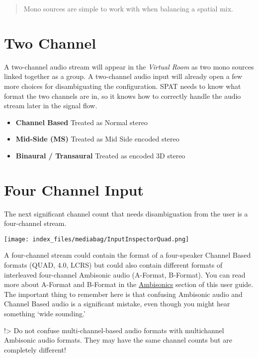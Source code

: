 \documentclass[
  letterpaper,
  DIV=11,
  numbers=noendperiod]{scrreport}
\providecommand{\tightlist}{%
  \setlength{\itemsep}{0pt}\setlength{\parskip}{0pt}}\usepackage{longtable,booktabs,array}
\begin{document}
\begin{quote}
Mono sources are simple to work with when balancing a spatial mix.
\end{quote}

\hypertarget{two-channel}{%
\section{Two Channel}\label{two-channel}}

A two-channel audio stream will appear in the \emph{Virtual Room} as two
mono sources linked together as a group. A two-channel audio input will
already open a few more choices for disambiguating the configuration.
SPAT needs to know what format the two channels are in, so it knows how
to correctly handle the audio stream later in the signal flow.

\begin{itemize}
\tightlist
\item
  \textbf{Channel Based} Treated as Normal stereo
\item
  \textbf{Mid-Side (MS)} Treated as Mid Side encoded stereo
\item
  \textbf{Binaural / Transaural} Treated as encoded 3D stereo
\end{itemize}

\hypertarget{four-channel-input}{%
\section{Four Channel Input}\label{four-channel-input}}

The next significant channel count that needs disambiguation from the
user is a four-channel stream.

\texttt{[image: index\_files/mediabag/InputInspectorQuad.png]}

A four-channel stream could contain the format of a four-speaker Channel
Based formats (QUAD, 4.0, LCRS) but could also contain different formats
of interleaved four-channel Ambisonic audio (A-Format, B-Format). You
can read more about A-Format and B-Format in the
\href{Scene_based_streams.md}{Ambisonics} section of this user guide.
The important thing to remember here is that confusing Ambisonic audio
and Channel Based audio is a significant mistake, even though you might
hear something `wide sounding.'

!\textgreater{} Do not confuse multi-channel-based audio formats with
multichannel Ambisonic audio formats. They may have the same channel
counts but are completely different!
\end{document}

